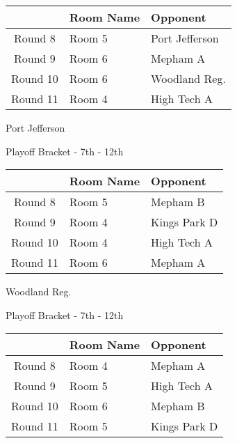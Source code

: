 \documentclass{article}%
\begin{document}
\vspace*{4pt}%
%
\begin{tabularx}{\textwidth}{|c|Y|Y|}%
\hline%
&Room Name&Opponent\\%
\hline%
Round 8&Room 5&Port Jefferson\\%
Round 9&Room 6&Mepham A\\%
Round 10&Room 6&Woodland Reg.\\%
Round 11&Room 4&High Tech A\\%
\hline%
\end{tabularx}%
\vspace*{80pt}%
\linebreak%
\newpage%
\begin{center}%
\begin{Huge}%
Port Jefferson%
\end{Huge}%
\vspace*{12pt}%
\linebreak%
\begin{Large}%
Playoff Bracket {-} 7th {-} 12th%
\end{Large}%
\end{center}%
\vspace*{4pt}%
%
\begin{tabularx}{\textwidth}{|c|Y|Y|}%
\hline%
&Room Name&Opponent\\%
\hline%
Round 8&Room 5&Mepham B\\%
Round 9&Room 4&Kings Park D\\%
Round 10&Room 4&High Tech A\\%
Round 11&Room 6&Mepham A\\%
\hline%
\end{tabularx}%
\vspace*{80pt}%
\linebreak%
\newpage%
\begin{center}%
\begin{Huge}%
Woodland Reg.%
\end{Huge}%
\vspace*{12pt}%
\linebreak%
\begin{Large}%
Playoff Bracket {-} 7th {-} 12th%
\end{Large}%
\end{center}%
\vspace*{4pt}%
%
\begin{tabularx}{\textwidth}{|c|Y|Y|}%
\hline%
&Room Name&Opponent\\%
\hline%
Round 8&Room 4&Mepham A\\%
Round 9&Room 5&High Tech A\\%
Round 10&Room 6&Mepham B\\%
Round 11&Room 5&Kings Park D\\%
\hline%
\end{tabularx}%
\end{document}
